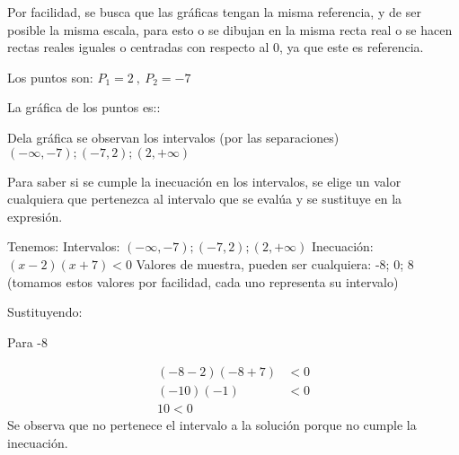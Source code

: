 \documentclass[12pt]{article}
\begin{document}
    Por facilidad, se busca que las gráficas tengan la misma referencia, y de ser
    posible la misma escala, para esto o se dibujan en la misma recta real o se hacen
    rectas reales iguales o centradas con respecto al 0, ya que este es referencia.

    Los puntos son: $ P_1 = 2\ ,\ P_2 =-7 $

    La gráfica de los puntos es::

    \vspace*{1cm}

    Dela gráfica se observan los intervalos (por las separaciones) $ \displaystyle
    (-\infty,-7);(-7,2);(2,+\infty)$


    Para saber si se cumple la inecuación en los intervalos, se elige un valor cualquiera
    que pertenezca al intervalo que se evalúa y se sustituye en la expresión.

    Tenemos:
    Intervalos: $ \displaystyle (-\infty,-7);(-7,2);(2,+\infty)$
    Inecuación: $ (x-2)(x+7) < 0 $
    Valores de muestra, pueden ser cualquiera:
    -8; 0; 8 (tomamos estos valores por facilidad, cada uno representa su intervalo)

    Sustituyendo:

    Para -8

    \begin{align*}
        (-8-2)(-8+7) & < 0  		\\
        (-10)(-1)   & < 0\\
        10 < 0
    \end{align*}
    Se observa que no pertenece el intervalo a la solución porque no cumple la inecuación.
\end{document}
